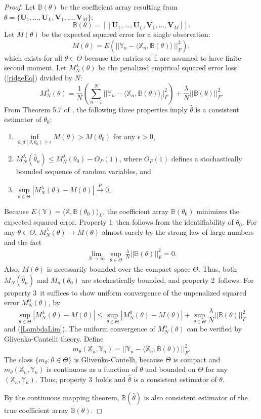 \documentclass[12pt]{article}
\def\U{\mathbf{U}}
\def\XX{\mathbb{X}}
\def\YY{\mathbb{Y}}
\def\EE{\mathbb{E}}
\def\V{\mathbf{V}}
\def\BB{\mathbb{B}}
\def\tp#1{[\![#1]\!]}
\newcommand{\tprod}[3] {
  \langle #1, #2 \rangle_{#3}}
\begin{document}
\begin{proof}
Let $\BB(\theta)$ be the coefficient array resulting from $\theta=\{\U_1, \hdots, \U_L, \V_1, \hdots, \V_M\}$: 
\[\BB(\theta) = \tp{\U_1,\hdots,\U_L,\V_1,\hdots,\V_M}.\]
Let $M(\theta)$ be the expected squared error  for a single observation: 
\[M(\theta) = E\left(||\YY_n - \tprod{\XX_n}{\BB(\theta)}\, ||_F^2 \right),\]
which exists for all $\theta \in \Theta$ because the entries of $\EE$ are assumed to have finite second moment.   
Let $M_N^\lambda(\theta)$ be the penalized empirical squared error loss (\ref{ridgeEq}) divided by $N$:  
\[M_N^\lambda(\theta) = \frac{1}{N} \left(\sum_{n=1}^N ||\YY_n - \tprod{\XX_n}{\BB(\theta)}||_F^2\right) + \frac{\lambda}{N} ||\BB(\theta)||^2_F.\]
From Theorem 5.7 of \cite{van2000asymptotic}, the following three properties imply  $\hat{\theta}$ is a consistent estimator of $\theta_0$:
\begin{enumerate}
\item $\underset{\theta: d(\theta,\theta_0) \geq \epsilon}{\inf} M(\theta)>M(\theta_0)$ for any $\epsilon>0$, 
\item $M_N^\lambda(\hat{\theta}_n) \leq M_N^\lambda(\theta_0)-O_P(1)$, where $O_P(1)$ defines a stochastically bounded sequence of random variables, and
\item $\underset{\theta \in \Theta}{\sup} |M_N^\lambda(\theta)-M(\theta)| \overset{P}{\rightarrow} 0$.  
\end{enumerate}
Because $E(\YY) = \tprod{\XX}{\BB(\theta_0)}{L}$,  the coefficient array $\BB(\theta_0)$  minimizes the expected squared error.  Property 1\ then follows from the identifiability of $\theta_0$.  For any $\theta \in \Theta$, $M_N^\lambda(\theta) \rightarrow M(\theta)$ almost surely by the strong law of large numbers and the fact 
\begin{align} \underset{N\rightarrow \infty}{\lim} \,  \underset{\theta \in \Theta}{\sup} \, \frac{\lambda}{N}  ||\BB(\theta)||^2_F = 0.\label{LambdaLim} \end{align}  Also, $M(\theta)$ is necessarily bounded over the compact space $\Theta$.  Thus, both $M_N(\hat{\theta}_n)$ and        
 $M_n(\theta_0)$  are stochastically bounded, and property 2\ follows.  
For property 3\, it suffices to show uniform convergence of the unpenalized squared error $M_N^0 (\theta)$, by
\[\underset{\theta \in \Theta}{\sup} |M_N^\lambda(\theta)-M(\theta)| \leq \underset{\theta \in \Theta}{\sup} |M_N^0(\theta)-M(\theta)|+ \underset{\theta \in \Theta}{\sup}\frac{\lambda}{N} ||\BB(\theta)||^2_F \]
and (\ref{LambdaLim}).  The uniform convergence of $M_N^0 (\theta)$ can be verified by Glivenko-Cantelli theory. Define \[m_\theta(\XX_n,\YY_n) =  ||\YY_n - \tprod{\XX_n}{\BB(\theta)} \,||_F^2.\] The class $\{m_\theta: \theta \in \Theta\}$ is Glivenko-Cantelli, because $\Theta$ is compact and  $m_\theta(\XX_n,\YY_n)$ is continuous as a function of $\theta$ and bounded on $\Theta$ for any $(\XX_n,\YY_n)$.  Thus, property 3\ holds and $\hat{\theta}$ is a consistent estimator of $\theta$.  

By the continuous mapping theorem,  $\BB(\hat{\theta})$ is also consistent estimator of the true coefficient array $\BB(\theta)$. 
\end{proof}
\end{document}
